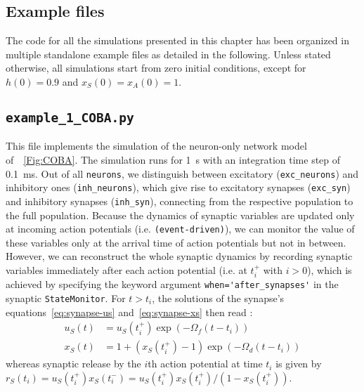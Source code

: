 \documentclass[a4paper, 11pt]{article}
\newcommand*{\figref}[1]{\figurename~\ref{#1}}
\begin{document}
\begin{appendices}
\section{Example files} \label{apx:example-files}
The code for all the simulations presented in this chapter has been organized in multiple standalone example files as detailed in the following.
Unless stated otherwise, all simulations start from zero initial conditions, except for $h(0) = 0.9$ and $x_S(0) = x_A(0) = 1$.

\subsection*{\lstinline|example_1_COBA.py|}
This file implements the simulation of the neuron-only network model of~\figref{Fig:COBA}.
The simulation runs for \SI{1}{s} with an integration time step of \SI{0.1}{\milli s}.
Out of all \lstinline|neurons|, we distinguish between excitatory (\lstinline|exc_neurons|) and inhibitory ones (\lstinline|inh_neurons|), which give rise to excitatory synapses (\lstinline|exc_syn|) and inhibitory synapses (\lstinline|inh_syn|), connecting from the respective population to the full population.
Because the dynamics of synaptic variables are updated only at incoming action potentials (i.e. \lstinline|(event-driven)|), we can monitor the value of these variables only at the arrival time of action potentials but not in between.
However, we can reconstruct the whole synaptic dynamics by recording synaptic variables immediately after each action potential (i.e. at $t_i^+$ with $i>0$), which is achieved by specifying the keyword argument \lstinline|when='after_synapses'| in the synaptic \lstinline|StateMonitor|.
For $t>t_i$, the solutions of the synapse's equations~\ref{eq:synapse-us} and~\ref{eq:synapse-xs} then read \citep{Tsodyks_LesHouches2005}:
\begin{align*}
	u_S(t) &= u_S(t_i^+) \exp \left(-\Omega_f (t-t_i)\right)\\
	x_S(t) &= 1 + \left(x_S(t_i^+)-1\right) \exp\left(-\Omega_d (t-t_i)\right)	
\end{align*}
whereas synaptic release by the $i$th action potential at time $t_i$ is given by $r_S(t_i) = u_S(t_i^+)x_S(t_i^-) = u_S(t_i^+)x_S(t_i^+)/\left(1-x_S(t_i^+) \right)$.


\end{appendices}
\end{document}
